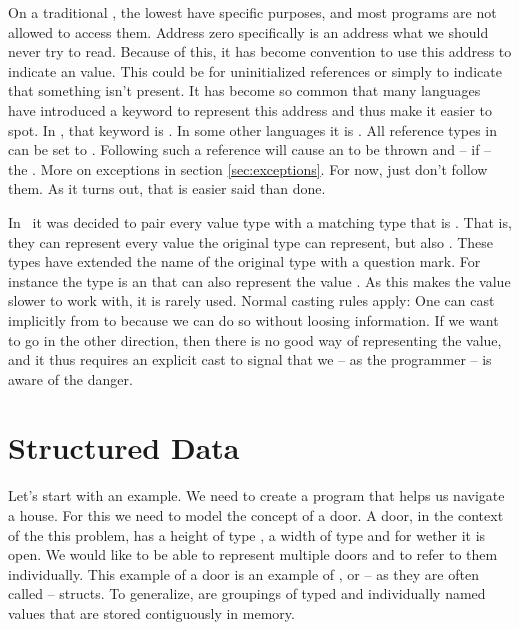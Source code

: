 On a traditional , the lowest  have specific purposes, and most programs are not allowed to access them. Address zero specifically is an address what we should never try to read. Because of this, it has become convention to use this address to indicate an  value. This could be for uninitialized references or simply to indicate that something isn't present. It has become so common that many languages have introduced a keyword to represent this address and thus make it easier to spot. In \csharp, that keyword is . In some other languages it is . All reference types in \csharp can be set to . Following such a reference will cause an  to be thrown and -- if  --  the . More on exceptions in section \ref{sec:exceptions}. For now, just don't follow them. As it turns out, that is easier said than done.

In \csharp\ it was decided to pair every value type with a matching type that is . That is, they can represent every value the original type can represent, but also . These types have extended the name of the original type with a question mark. For instance the type  is an  that can also represent the value . As this makes the value slower to work with, it is rarely used. Normal casting rules apply: One can cast implicitly from  to  because we can do so without loosing information. If we want to go in the other direction, then there is no good way of representing the  value, and it thus requires an explicit cast to signal that we -- as the programmer -- is aware of the danger.

\section{Structured Data}
\label{sec:primdata:struct}

Let's start with an example. We need to create a program that helps us navigate a house. For this we need to model the concept of a door. A door, in the context of the this problem, has a height of type , a width of type  and  for wether it is open. We would like to be able to represent multiple doors and to refer to them individually. This example of a door is an example of , or -- as they are often called -- structs. To generalize,  are groupings of typed and individually named values that are stored contiguously in memory.

